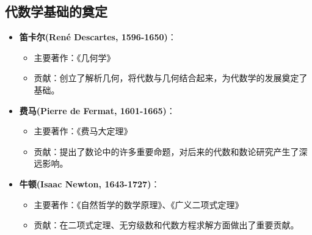 \documentclass{Math_Note}
\begin{document}
\subsection{代数学基础的奠定}
\begin{itemize}
    \item \textbf{笛卡尔(René Descartes, 1596-1650)}：
    \begin{itemize}
        \item 主要著作：《几何学》
        \item 贡献：创立了解析几何，将代数与几何结合起来，为代数学的发展奠定了基础。
    \end{itemize}
    
    \item \textbf{费马(Pierre de Fermat, 1601-1665)}：
    \begin{itemize}
        \item 主要著作：《费马大定理》
        \item 贡献：提出了数论中的许多重要命题，对后来的代数和数论研究产生了深远影响。
    \end{itemize}
    
    \item \textbf{牛顿(Isaac Newton, 1643-1727)}：
    \begin{itemize}
        \item 主要著作：《自然哲学的数学原理》、《广义二项式定理》
        \item 贡献：在二项式定理、无穷级数和代数方程求解方面做出了重要贡献。
    \end{itemize}
\end{itemize}
\end{document}
